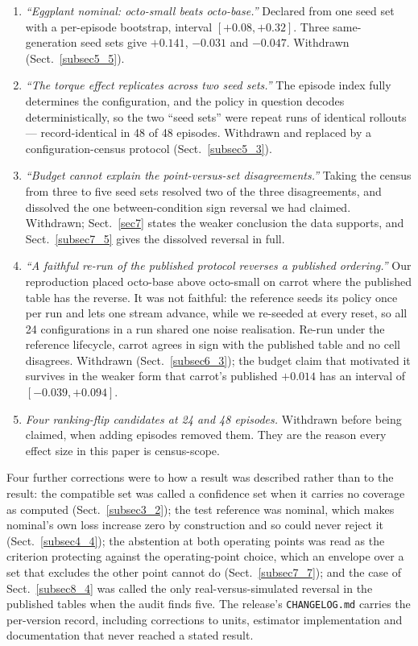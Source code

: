 \documentclass[pdflatex,iicol,sn-apa]{sn-jnl}
\theoremstyle{remark}
\begin{document}
\begin{appendices}
\begin{enumerate}
\item \emph{``Eggplant nominal: octo-small beats octo-base.''} Declared from one seed set with a
per-episode bootstrap, interval $[+0.08, +0.32]$. Three same-generation seed sets give $+0.141$,
$-0.031$ and $-0.047$. Withdrawn (Sect.~\ref{subsec5_5}).
\item \emph{``The torque effect replicates across two seed sets.''} The episode index fully
determines the configuration, and the policy in question decodes deterministically, so the two
``seed sets'' were repeat runs of identical rollouts --- record-identical in 48 of 48 episodes.
Withdrawn and replaced by a configuration-census protocol (Sect.~\ref{subsec5_3}).
\item \emph{``Budget cannot explain the point-versus-set disagreements.''} Taking the census from
three to five seed sets resolved two of the three disagreements, and dissolved the one
between-condition sign reversal we had claimed. Withdrawn; Sect.~\ref{sec7} states the weaker
conclusion the data supports, and Sect.~\ref{subsec7_5} gives the dissolved reversal in full.
\item \emph{``A faithful re-run of the published protocol reverses a published ordering.''} Our
reproduction placed octo-base above octo-small on carrot where the published table has the reverse.
It was not faithful: the reference seeds its policy once per run and lets one stream advance, while
we re-seeded at every reset, so all 24 configurations in a run shared one noise realisation. Re-run
under the reference lifecycle, carrot agrees in sign with the published table and no cell disagrees.
Withdrawn (Sect.~\ref{subsec6_3}); the budget claim that motivated it survives in the weaker form
that carrot's published $+0.014$ has an interval of $[-0.039, +0.094]$.
\item \emph{Four ranking-flip candidates at 24 and 48 episodes.} Withdrawn before being claimed,
when adding episodes removed them. They are the reason every effect size in this paper is
census-scope.
\end{enumerate}

Four further corrections were to how a result was described rather than to the result: the
compatible set was called a confidence set when it carries no coverage as computed
(Sect.~\ref{subsec3_2}); the test reference was nominal, which makes nominal's own loss increase
zero by construction and so could never reject it (Sect.~\ref{subsec4_4}); the abstention at both
operating points was read as the criterion protecting against the operating-point choice, which an
envelope over a set that excludes the other point cannot do (Sect.~\ref{subsec7_7}); and the case
of Sect.~\ref{subsec8_4} was called the only real-versus-simulated reversal in the published tables
when the audit finds five. The release's \texttt{CHANGELOG.md} carries the per-version record,
including corrections to units, estimator implementation and documentation that never reached a
stated result.

\end{appendices}


\end{document}
